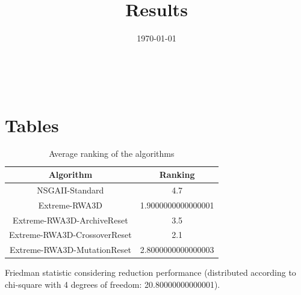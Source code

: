 \documentclass{article}
\title{Results}
\author{}
\date{\today}
\begin{document}
\oddsidemargin 0in \topmargin 0in\maketitle
\
\section{Tables}
\begin{table}[!htp]
\centering
\caption{Average ranking of the algorithms}
\begin{tabular}{c|c}
Algorithm&Ranking\\
\hline
NSGAII-Standard&4.7\\
Extreme-RWA3D&1.9000000000000001\\
Extreme-RWA3D-ArchiveReset&3.5\\
Extreme-RWA3D-CrossoverReset&2.1\\
Extreme-RWA3D-MutationReset&2.8000000000000003\\
\end{tabular}
\end{table}


Friedman statistic considering reduction performance (distributed according to chi-square with 4 degrees of freedom: 20.80000000000001).
\end{document}
